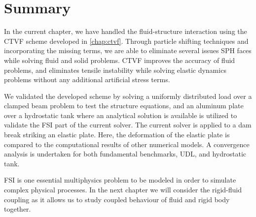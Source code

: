 \section{Summary}\label{fsi:summary}
In the current chapter, we have handled the fluid-structure interaction using
the CTVF scheme developed in \cref{chap:ctvf}. Through particle shifting
techniques and incorporating the missing terms, we are able to eliminate several
issues SPH faces while solving fluid and solid problems. CTVF improves the
accuracy of fluid problems, and eliminates tensile instability while solving
elastic dynamics problems without any additional artificial stress terms.

We validated the developed scheme by solving a uniformly distributed load over a
clamped beam problem to test the structure equations, and an aluminum plate over
a hydrostatic tank where an analytical solution is available is utilized to
validate the FSI part of the current solver. The current solver is applied to a
dam break striking an elastic plate. Here, the deformation of the elastic plate
is compared to the computational results of other numerical models. A
convergence analysis is undertaken for both fundamental benchmarks, UDL, and
hydrostatic tank.

FSI is one essential multiphysics problem to be modeled in order to simulate
complex physical processes. In the next chapter we will consider the rigid-fluid
coupling as it allows us to study coupled behaviour of fluid and rigid body
together.
